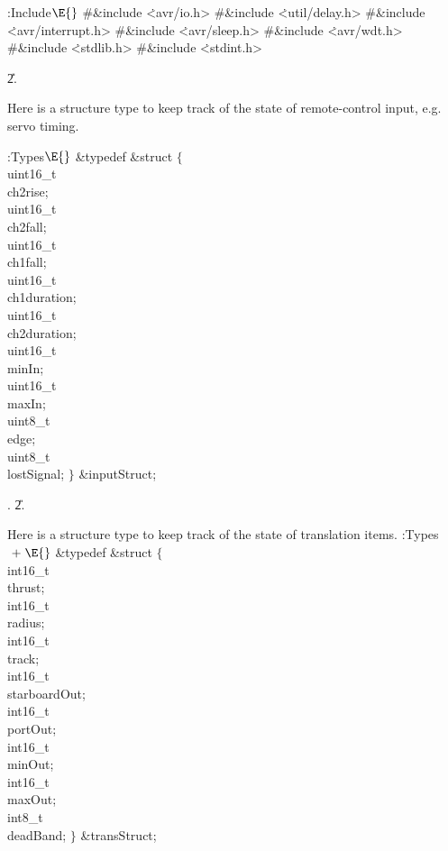 \B{}:Include\X${}\E{}$\6
\8\#\&{include} \.{<avr/io.h>}\6
\8\#\&{include} \.{<util/delay.h>}\6
\8\#\&{include} \.{<avr/interrupt.h>}\6
\8\#\&{include} \.{<avr/sleep.h>}\6
\8\#\&{include} \.{<avr/wdt.h>}\6
\8\#\&{include} \.{<stdlib.h>}\6
\8\#\&{include} \.{<stdint.h>}\par
\U2.\fi

Here is a structure type to keep track of the state of remote-control
input, e.g. servo timing.

\Y\B\4:Types\X${}\E{}$\6
\&{typedef} \&{struct} ${}\{{}$\1\6
\\{uint16\_t}\\{ch2rise};\6
\\{uint16\_t}\\{ch2fall};\6
\\{uint16\_t}\\{ch1fall};\6
\\{uint16\_t}\\{ch1duration};\6
\\{uint16\_t}\\{ch2duration};\6
\\{uint16\_t}\\{minIn};\6
\\{uint16\_t}\\{maxIn};\6
\\{uint8\_t}\\{edge};\6
\\{uint8\_t}\\{lostSignal};\2\6
${}\}{}$ \&{inputStruct};\par
{}.
\U2.\fi

Here is a structure type to keep track of the state of translation items.
\Y\B\4:Types\X${}\mathrel+\E{}$\6
\&{typedef} \&{struct} ${}\{{}$\1\6
\\{int16\_t}\\{thrust};\6
\\{int16\_t}\\{radius};\6
\\{int16\_t}\\{track};\6
\\{int16\_t}\\{starboardOut};\6
\\{int16\_t}\\{portOut};\6
\\{int16\_t}\\{minOut};\6
\\{int16\_t}\\{maxOut};\6
\\{int8\_t}\\{deadBand};\2\6
${}\}{}$ \&{transStruct};\par
\fi


